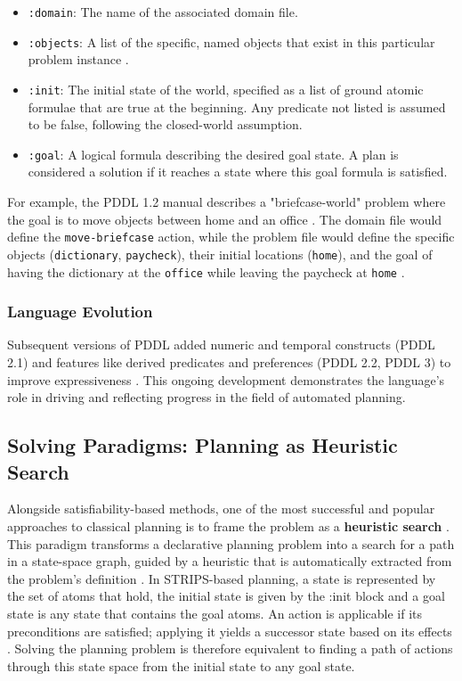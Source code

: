 \documentclass[12pt, a4paper, oneside]{report} %
\begin{document}
\begin{itemize}
    \item \texttt{:domain}: The name of the associated domain file.
    \item \texttt{:objects}: A list of the specific, named objects that exist in this particular problem instance .
    \item \texttt{:init}: The initial state of the world, specified as a list of ground atomic formulae that are true at the beginning. Any predicate not listed is assumed to be false, following the closed-world assumption.
    \item \texttt{:goal}: A logical formula describing the desired goal state. A plan is considered a solution if it reaches a state where this goal formula is satisfied.
\end{itemize}

For example, the PDDL 1.2 manual describes a "briefcase-world" problem where the goal is to move objects between home and an office . The domain file would define the \texttt{move-briefcase} action, while the problem file would define the specific objects (\texttt{dictionary}, \texttt{paycheck}), their initial locations (\texttt{home}), and the goal of having the dictionary at the \texttt{office} while leaving the paycheck at \texttt{home} \cite{mcdermott1998pddl}.
\subsubsection*{Language Evolution}
Subsequent versions of PDDL added numeric and temporal constructs (PDDL 2.1) and features like derived predicates and preferences (PDDL 2.2, PDDL 3) to improve expressiveness \cite{edelkamp2004pddl22, gerevini2005plan, thiebaux2005defense}. This ongoing development demonstrates the language's role in driving and reflecting progress in the field of automated planning.
\subsection{Solving Paradigms: Planning as Heuristic Search}
\label{sec:heuristic_search}

Alongside satisfiability-based methods, one of the most successful and popular approaches to classical planning is to frame the problem as a \textbf{heuristic search} \cite{bonet2001planning, koenig2002heuristic, segovia2021generalized}. This paradigm transforms a declarative planning problem into a search for a path in a state-space graph, guided by a heuristic that is automatically extracted from the problem's definition \cite{bonet2001planning}.
In STRIPS-based planning, a state is represented by the set of atoms that hold, the initial state is given by the :init block and a goal state is any state that contains the goal atoms. An action is applicable if its preconditions are satisfied; applying it yields a successor state based on its effects \cite{bonet2001planning}. Solving the planning problem is therefore equivalent to finding a path of actions through this state space from the initial state to any goal state.
\end{document}
